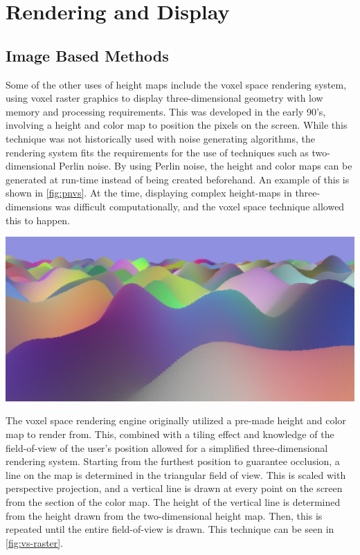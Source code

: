 \documentclass[10pt]{report}
\begin{document}
	\vspace{10pt}
	\let\clearpage\relax
	\chapter{Rendering and Display}
	
		\section{Image Based Methods}
	
		Some of the other uses of height maps include the voxel space rendering system, using voxel raster graphics to display three-dimensional geometry with low memory and processing requirements. This was developed in the early 90's, involving a height and color map to position the pixels on the screen. While this technique was not historically used with noise generating algorithms, the rendering system fits the requirements for the use of techniques such as two-dimensional Perlin noise. By using Perlin noise, the height and color maps can be generated at run-time instead of being created beforehand. An example of this is shown in \autoref{fig:pnvs}. At the time, displaying complex height-maps in three-dimensions was difficult computationally, and the voxel space technique allowed this to happen. 
		
		\begin{minipage}{\textwidth}
			\centering
			\includegraphics[scale=.15]{proc-voxel}
			\label{fig:pnvs}
		\end{minipage}
		
		The voxel space rendering engine originally utilized a pre-made height and color map to render from. This, combined with a tiling effect and knowledge of the field-of-view of the user's position allowed for a simplified three-dimensional rendering system. Starting from the furthest position to guarantee occlusion, a line on the map is determined in the triangular field of view. This is scaled with perspective projection, and a vertical line is drawn at every point on the screen from the section of the color map. The height of the vertical line is determined from the height drawn from the two-dimensional height map. Then, this is repeated until the entire field-of-view is drawn. This technique can be seen in \autoref{fig:vs-raster}. 
		
\end{document}
